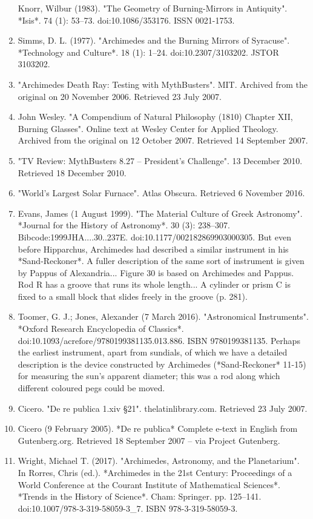 \begin{enumerate}
Knorr, Wilbur (1983). "The Geometry of Burning-Mirrors in Antiquity". *Isis*. 74 (1): 53–73. doi:10.1086/353176. ISSN 0021-1753.
\item Simms, D. L. (1977). "Archimedes and the Burning Mirrors of Syracuse". *Technology and Culture*. 18 (1): 1–24. doi:10.2307/3103202. JSTOR 3103202.
\item "Archimedes Death Ray: Testing with MythBusters". MIT. Archived from the original on 20 November 2006. Retrieved 23 July 2007.
\item John Wesley. "A Compendium of Natural Philosophy (1810) Chapter XII, Burning Glasses". Online text at Wesley Center for Applied Theology. Archived from the original on 12 October 2007. Retrieved 14 September 2007.
\item "TV Review: MythBusters 8.27 – President's Challenge". 13 December 2010. Retrieved 18 December 2010.
\item "World's Largest Solar Furnace". Atlas Obscura. Retrieved 6 November 2016.
\item Evans, James (1 August 1999). "The Material Culture of Greek Astronomy". *Journal for the History of Astronomy*. 30 (3): 238–307. Bibcode:1999JHA....30..237E. doi:10.1177/002182869903000305. But even before Hipparchus, Archimedes had described a similar instrument in his *Sand-Reckoner*. A fuller description of the same sort of instrument is given by Pappus of Alexandria... Figure 30 is based on Archimedes and Pappus. Rod R has a groove that runs its whole length... A cylinder or prism C is fixed to a small block that slides freely in the groove (p. 281).
\item Toomer, G. J.; Jones, Alexander (7 March 2016). "Astronomical Instruments". *Oxford Research Encyclopedia of Classics*. doi:10.1093/acrefore/9780199381135.013.886. ISBN 9780199381135. Perhaps the earliest instrument, apart from sundials, of which we have a detailed description is the device constructed by Archimedes (*Sand-Reckoner* 11-15) for measuring the sun's apparent diameter; this was a rod along which different coloured pegs could be moved.
\item Cicero. "De re publica 1.xiv §21". thelatinlibrary.com. Retrieved 23 July 2007.
\item Cicero (9 February 2005). *De re publica* Complete e-text in English from Gutenberg.org. Retrieved 18 September 2007 – via Project Gutenberg.
\item Wright, Michael T. (2017). "Archimedes, Astronomy, and the Planetarium". In Rorres, Chris (ed.). *Archimedes in the 21st Century: Proceedings of a World Conference at the Courant Institute of Mathematical Sciences*. *Trends in the History of Science*. Cham: Springer. pp. 125–141. doi:10.1007/978-3-319-58059-3_7. ISBN 978-3-319-58059-3.

\end{enumerate}
